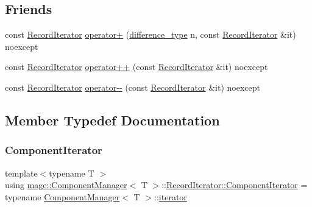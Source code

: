 \subsection*{Friends}
\begin{DoxyCompactItemize}
\item 
const \mbox{\hyperlink{classmage_1_1_component_manager_1_1_record_iterator}{Record\+Iterator}} \mbox{\hyperlink{classmage_1_1_component_manager_1_1_record_iterator_ae69b32a2e0593d39292b95dbdc5ab8f1}{operator+}} (\mbox{\hyperlink{classmage_1_1_component_manager_1_1_record_iterator_a3ca7b08fca57e3f69c5de58be46edd70}{difference\+\_\+type}} n, const \mbox{\hyperlink{classmage_1_1_component_manager_1_1_record_iterator}{Record\+Iterator}} \&it) noexcept
\item 
const \mbox{\hyperlink{classmage_1_1_component_manager_1_1_record_iterator}{Record\+Iterator}} \mbox{\hyperlink{classmage_1_1_component_manager_1_1_record_iterator_a1384375b5c2a6663047075a355cca773}{operator++}} (const \mbox{\hyperlink{classmage_1_1_component_manager_1_1_record_iterator}{Record\+Iterator}} \&it) noexcept
\item 
const \mbox{\hyperlink{classmage_1_1_component_manager_1_1_record_iterator}{Record\+Iterator}} \mbox{\hyperlink{classmage_1_1_component_manager_1_1_record_iterator_a7b23a9a0a1464d6c8c7ee34870e42e12}{operator-\/-\/}} (const \mbox{\hyperlink{classmage_1_1_component_manager_1_1_record_iterator}{Record\+Iterator}} \&it) noexcept
\end{DoxyCompactItemize}


\subsection{Member Typedef Documentation}
\mbox{\label{classmage_1_1_component_manager_1_1_record_iterator_aa9973dbab16d4cf276118634b8b43ece}} 
\subsubsection{\texorpdfstring{Component\+Iterator}{ComponentIterator}}
{\footnotesize\ttfamily template$<$typename T $>$ \\
using \mbox{\hyperlink{classmage_1_1_component_manager}{mage\+::\+Component\+Manager}}$<$ T $>$\+::\mbox{\hyperlink{classmage_1_1_component_manager_1_1_record_iterator_aa9973dbab16d4cf276118634b8b43ece}{Record\+Iterator\+::\+Component\+Iterator}} =  typename \mbox{\hyperlink{classmage_1_1_component_manager}{Component\+Manager}}$<$ T $>$\+::\mbox{\hyperlink{classmage_1_1_component_manager_a28023a75938eb74870ba4b5952ddb61f}{iterator}}}

